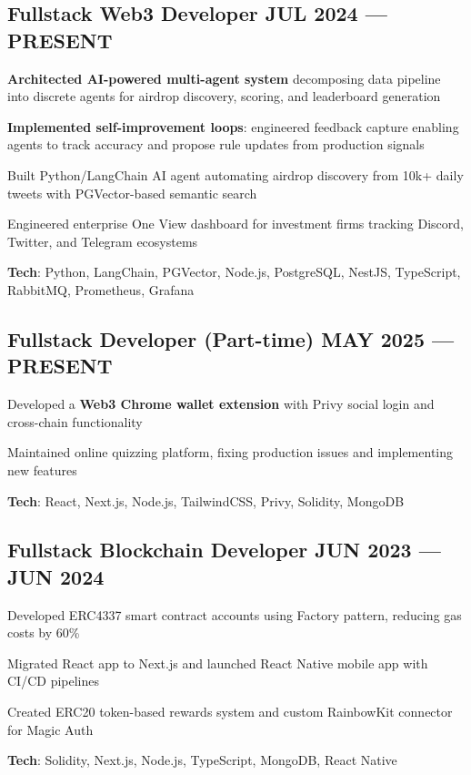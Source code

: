 \documentclass[letter,10pt]{article}
\begin{document}
\subsection{{Fullstack Web3 Developer \hfill JUL 2024 --- PRESENT}}
\begin{zitemize}
  \item \textbf{Architected AI-powered multi-agent system} decomposing data pipeline into discrete agents for airdrop discovery, scoring, and leaderboard generation
  \item \textbf{Implemented self-improvement loops}: engineered feedback capture enabling agents to track accuracy and propose rule updates from production signals
  \item Built Python/LangChain AI agent automating airdrop discovery from 10k+ daily tweets with PGVector-based semantic search
  \item Engineered enterprise One View dashboard for investment firms tracking Discord, Twitter, and Telegram ecosystems
  \item \textbf{Tech}: Python, LangChain, PGVector, Node.js, PostgreSQL, NestJS, TypeScript, RabbitMQ, Prometheus, Grafana
\end{zitemize}


\subsection{{Fullstack Developer (Part-time) \hfill MAY 2025 --- PRESENT}}
\begin{zitemize}
  \item Developed a \textbf{Web3 Chrome wallet extension} with Privy social login and cross-chain functionality
  \item Maintained online quizzing platform, fixing production issues and implementing new features
  \item \textbf{Tech}: React, Next.js, Node.js, TailwindCSS, Privy, Solidity, MongoDB
\end{zitemize}



\subsection{{ Fullstack Blockchain Developer \hfill JUN 2023 --- JUN 2024}}
\begin{zitemize}
  \item Developed ERC4337 smart contract accounts using Factory pattern, reducing gas costs by 60\%
  \item Migrated React app to Next.js and launched React Native mobile app with CI/CD pipelines
  \item Created ERC20 token-based rewards system and custom RainbowKit connector for Magic Auth
  \item \textbf{Tech}: Solidity, Next.js, Node.js, TypeScript, MongoDB, React Native
\end{zitemize}
\end{document}

